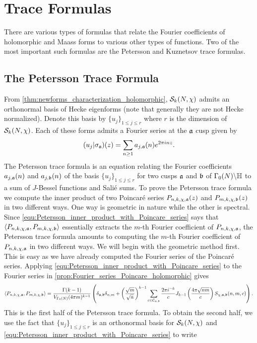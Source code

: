 \chapter{Trace Formulas}
  There are various types of formulas that relate the Fourier coefficients of holomorphic and Maass forms to various other types of functions. Two of the most important such formulas are the Petersson and Kuznetsov trace formulas.
  \section{The Petersson Trace Formula}
    From \cref{thm:newforms_characterization_holomorphic}, $\mathcal{S}_{k}(N,\chi)$ admits an orthonormal basis of Hecke eigenforms (note that generally they are not Hecke normalized). Denote this basis by $\{u_{j}\}_{1 \le j \le r}$ where $r$ is the dimension of $\mathcal{S}_{k}(N,\chi)$. Each of these forms admits a Fourier series at the $\mathfrak{a}$ cusp given by
    \[
      (u_{j}|\sigma_{\mathfrak{a}})(z) = \sum_{n \ge 1}a_{j,\mathfrak{a}}(n)e^{2\pi inz}.
    \]
    The Petersson trace formula is an equation relating the Fourier coefficients $a_{j,\mathfrak{a}}(n)$ and $a_{j,\mathfrak{b}}(n)$ of the basis $\{u_{j}\}_{1 \le j \le r}$ for two cusps $\mathfrak{a}$ and $\mathfrak{b}$ of $\Gamma_{0}(N)\backslash\mathbb{H}$ to a sum of $J$-Bessel functions and Sali\'e sums. To prove the Petersson trace formula we compute the inner product of two Poincar\'e series $P_{n,k,\chi,\mathfrak{a}}(z)$ and $P_{m,k,\chi,\mathfrak{b}}(z)$ in two different ways. One way is geometric in nature while the other is spectral. Since \cref{equ:Petersson_inner_product_with_Poincare_series} says that $\langle P_{n,k,\chi,\mathfrak{a}},P_{m,k,\chi,\mathfrak{b}}\rangle$ essentially extracts the $m$-th Fourier coefficient of $P_{n,k,\chi,\mathfrak{a}}$, the Petersson trace formula amounts to computing the $m$-th Fourier coefficient of $P_{n,k,\chi,\mathfrak{a}}$ in two different ways. We will begin with the geometric method first. This is easy as we have already computed the Fourier series of the Poincar\'e series. Applying \cref{equ:Petersson_inner_product_with_Poincare_series} to the Fourier series in \cref{prop:Fourier_series_Poincare_holomorphic} gives
    \[
      \langle P_{n,k,\chi,\mathfrak{a}},P_{m,k,\chi,\mathfrak{b}}\rangle = \frac{\Gamma(k-1)}{V_{\Gamma_{0}(N)}(4\pi m)^{k-1}}\left(\delta_{\mathfrak{a},\mathfrak{b}}\delta_{n,m}+\left(\frac{\sqrt{m}}{\sqrt{n}}\right)^{k-1}\sum_{c \in \mathcal{C}_{\mathfrak{a},\mathfrak{b}}}\frac{2\pi i^{-k}}{c}J_{k-1}\left(\frac{4\pi\sqrt{nm}}{c}\right)S_{\chi,\mathfrak{a},\mathfrak{b}}(n,m,c)\right).
    \]
    This is the first half of the Petersson trace formula. To obtain the second half, we use the fact that $\{u_{j}\}_{1 \le j \le r}$ is an orthonormal basis for $\mathcal{S}_{k}(N,\chi)$ and \cref{equ:Petersson_inner_product_with_Poincare_series} to write
